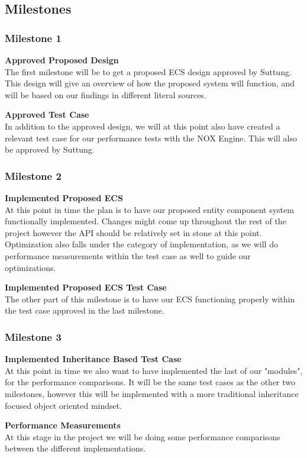 \subsection{Milestones}
\subsubsection{Milestone 1}
\noindent\textbf{Approved Proposed Design}\\
The first milestone will be to get a proposed ECS design approved by Suttung.
This design will give an overview of how the proposed system will function,
and will be based on our findings in different literal sources.

\noindent\textbf{Approved Test Case}\\
In addition to the approved design, we will at this point also have created a
relevant test case for our performance tests with the NOX Engine. 
This will also be approved by Suttung.

\subsubsection{Milestone 2}
\noindent\textbf{Implemented Proposed ECS}\\
At this point in time the plan is to have our proposed entity component system
functionally implemented. Changes might come up throughout the rest of the project
however the API should be relatively set in stone at this point.
Optimization also falls under the category of implementation, as we will do 
performance measurements within the test case as well to guide our optimizations.

\noindent\textbf{Implemented Proposed ECS Test Case}\\
The other part of this milestone is to have our ECS functioning properly within
the test case approved in the last milestone. 

\subsubsection{Milestone 3}
\noindent\textbf{Implemented Inheritance Based Test Case}\\
At this point in time we also want to have implemented the last of our "modules",
for the performance comparisons. It will be the same test cases as the other two
milestones, however this will be implemented with a more traditional inheritance focused
object oriented mindset.

\noindent\textbf{Performance Measurements}\\
At this stage in the project we will be doing some performance comparisons between
the different implementations.

